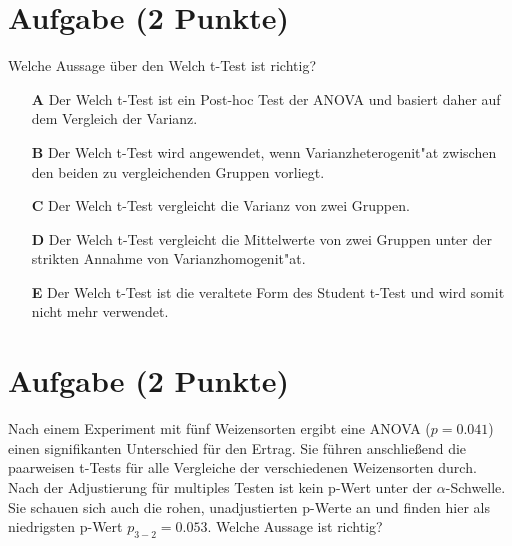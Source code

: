 \documentclass[a4paper, 10pt]{scrartcl}\usepackage[]{graphicx}\usepackage[]{xcolor}
\begin{document}
\section{Aufgabe \hfill (2 Punkte)}

Welche Aussage {\"u}ber den Welch t-Test ist richtig?



\begin{enumerate}
\item [\textbf{A} \msquare] Der Welch t-Test ist ein Post-hoc Test der ANOVA und basiert daher auf dem Vergleich der Varianz.
\item [\textbf{B} \msquare] Der Welch t-Test wird angewendet, wenn Varianzheterogenit{"a}t zwischen den beiden zu vergleichenden Gruppen vorliegt.
\item [\textbf{C} \msquare] Der Welch t-Test vergleicht die Varianz von zwei Gruppen.
\item [\textbf{D} \msquare] Der Welch t-Test vergleicht die Mittelwerte von zwei Gruppen unter der strikten Annahme von Varianzhomogenit{"a}t.
\item [\textbf{E} \msquare] Der Welch t-Test ist die veraltete Form des Student t-Test und wird somit nicht mehr verwendet.
\end{enumerate}  

\section{Aufgabe \hfill (2 Punkte)}

Nach einem Experiment mit f{\"u}nf Weizensorten ergibt eine ANOVA ($p = 0.041$)
einen signifikanten Unterschied f{\"u}r den Ertrag. Sie f{\"u}hren anschlie{\ss}end die
paarweisen t-Tests f{\"u}r alle Vergleiche der verschiedenen Weizensorten
durch. Nach der Adjustierung f{\"u}r multiples Testen ist kein p-Wert unter der
$\alpha$-Schwelle. Sie schauen sich auch die rohen, unadjustierten p-Werte
an und finden hier als niedrigsten p-Wert $p_{3-2} = 0.053$. Welche Aussage
ist richtig? 
\end{document}
